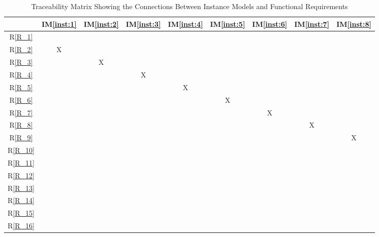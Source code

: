 \documentclass[12pt]{article}
\newcommand{\iref}[1]{IM\ref{#1}}
\newcommand{\rref}[1]{R\ref{#1}}
\begin{document}
\begin{table}[h!]
\centering
\begin{tabular}{|c|c|c|c|c|c|c|c|c|}
\hline
	& \iref{inst:1} & \iref{inst:2}& \iref{inst:3} & \iref{inst:4} & \iref{inst:5} & \iref{inst:6}& \iref{inst:7}& \iref{inst:8}\\
\hline

\rref{R_1}          & & & & & & & &  \\ \hline
\rref{R_2}          &X& & & & & & &  \\ \hline
\rref{R_3}          & &X& & & & & &  \\ \hline
\rref{R_4}          & & &X& & & & &  \\ \hline
\rref{R_5}          & & & &X& & & &  \\ \hline
\rref{R_6}          & & & & &X& & &  \\ \hline
\rref{R_7}          & & & & & &X& &  \\ \hline
\rref{R_8}          & & & & & & &X&  \\ \hline
\rref{R_9}          & & & & & & & &X \\ \hline
\rref{R_10}         & & & & & & & &  \\ \hline
\rref{R_11}         & & & & & & & &  \\ \hline
\rref{R_12}         & & & & & & & &  \\ \hline
\rref{R_13}         & & & & & & & &  \\ \hline
\rref{R_14}         & & & & & & & &  \\ \hline
\rref{R_15}         & & & & & & & &  \\ \hline
\rref{R_16}         & & & & & & & &  \\ \hline
\end{tabular}
\caption{Traceability Matrix Showing the Connections Between Instance Models and Functional Requirements}
\label{Table:trace_requirements}
\end{table}
\end{document}
